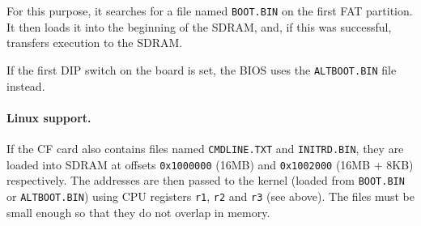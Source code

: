 \documentclass[a4paper,11pt]{article}
\begin{document}
For this purpose, it searches for a file named \verb!BOOT.BIN! on the first FAT partition. It then loads it into the beginning of the SDRAM, and, if this was successful, transfers execution to the SDRAM.

If the first DIP switch on the board is set, the BIOS uses the \verb!ALTBOOT.BIN! file instead.

\paragraph{Linux support.} If the CF card also contains files named \verb!CMDLINE.TXT! and \verb!INITRD.BIN!, they are loaded into SDRAM at offsets \verb!0x1000000! (16MB) and \verb!0x1002000! (16MB + 8KB) respectively. The addresses are then passed to the kernel (loaded from \verb!BOOT.BIN! or \verb!ALTBOOT.BIN!) using CPU registers \verb!r1!, \verb!r2! and \verb!r3! (see above). The files must be small enough so that they do not overlap in memory.
\end{document}
